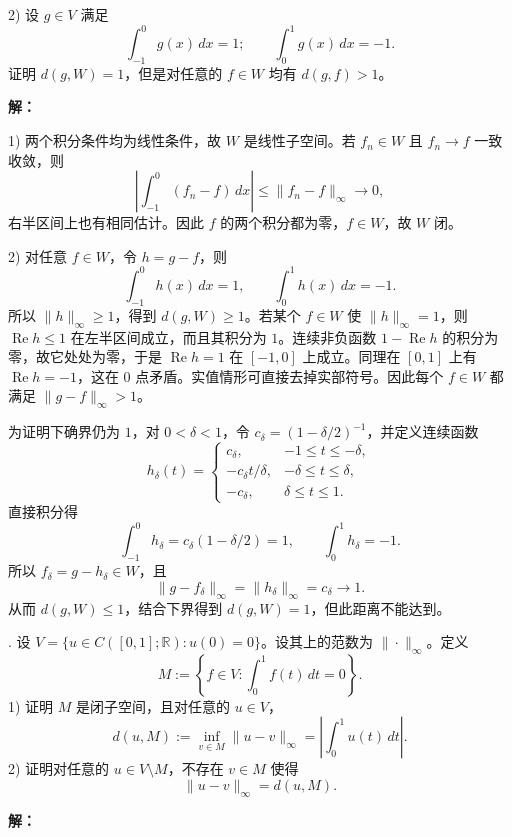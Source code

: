 \documentclass{article}
\begin{document}
2) 设 $g\in V$ 满足
\[
\int_{-1}^0 g(x)\,dx=1;\qquad \int_0^1 g(x)\,dx=-1.
\]
证明 $d(g,W)=1$，但是对任意的 $f\in W$ 均有 $d(g,f)>1$。


\par{}\noindent\textbf{解：}\par\nopagebreak[4]



1) 两个积分条件均为线性条件，故 $W$ 是线性子空间。若 $f_n\in W$ 且 $f_n\to f$ 一致收敛，则
\[
\left|\int_{-1}^0(f_n-f)\,dx\right|\le\|f_n-f\|_\infty\to0,
\]
右半区间上也有相同估计。因此 $f$ 的两个积分都为零，$f\in W$，故 $W$ 闭。

2) 对任意 $f\in W$，令 $h=g-f$，则
\[
\int_{-1}^0h(x)\,dx=1,\qquad\int_0^1h(x)\,dx=-1.
\]
所以 $\|h\|_\infty\ge1$，得到 $d(g,W)\ge1$。若某个 $f\in W$ 使 $\|h\|_\infty=1$，则 $\operatorname{Re}h\le1$ 在左半区间成立，而且其积分为 $1$。连续非负函数 $1-\operatorname{Re}h$ 的积分为零，故它处处为零，于是 $\operatorname{Re}h=1$ 在 $[-1,0]$ 上成立。同理在 $[0,1]$ 上有 $\operatorname{Re}h=-1$，这在 $0$ 点矛盾。实值情形可直接去掉实部符号。因此每个 $f\in W$ 都满足 $\|g-f\|_\infty>1$。

为证明下确界仍为 $1$，对 $0<\delta<1$，令 $c_\delta=(1-\delta/2)^{-1}$，并定义连续函数
\[
h_\delta(t)=
\begin{cases}
c_\delta,&-1\le t\le-\delta,\\
-c_\delta t/\delta,&-\delta\le t\le\delta,\\
-c_\delta,&\delta\le t\le1.
\end{cases}
\]
直接积分得
\[
\int_{-1}^0h_\delta=c_\delta(1-\delta/2)=1,\qquad
\int_0^1h_\delta=-1.
\]
所以 $f_\delta=g-h_\delta\in W$，且
\[
\|g-f_\delta\|_\infty=\|h_\delta\|_\infty=c_\delta\longrightarrow1.
\]
从而 $d(g,W)\le1$，结合下界得到 $d(g,W)=1$，但此距离不能达到。


\par\medskip{}. 设 $V=\{u\in C([0,1];\mathbb R):u(0)=0\}$。设其上的范数为 $\|\cdot\|_\infty$。定义
\[
M:=\left\{f\in V:\int_0^1 f(t)\,dt=0\right\}.
\]
1) 证明 $M$ 是闭子空间，且对任意的 $u\in V$，
\[
d(u,M):=\inf_{v\in M}\|u-v\|_\infty=\left|\int_0^1u(t)\,dt\right|.
\]
2) 证明对任意的 $u\in V\setminus M$，不存在 $v\in M$ 使得
\[
\|u-v\|_\infty=d(u,M).
\]


\par{}\noindent\textbf{解：}\par\nopagebreak[4]
\end{document}
